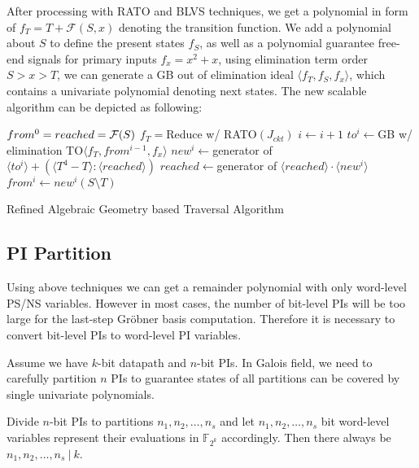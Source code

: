 After processing with RATO and BLVS techniques, we get a polynomial in form of $f_T = T+\mathcal{F}(S,x)$
denoting the transition function. We add a polynomial about $S$ to define the present states $f_S$,
as well as a polynomial guarantee free-end signals for primary inputs $f_x = x^2+x$, using elimination term order $S>x>T$,
we can generate a GB out of elimination ideal $\langle f_T,f_S,f_x\rangle$, which contains a univariate
polynomial denoting next states. The new scalable algorithm can be depicted as following:

\begin{algorithm}[hbt]
\SetAlgoNoLine

  $from^0 = reached = {\mathcal{F}}(S)$\;
  $f_T = $Reduce w/ RATO$(J_{ckt})$\;
  {
  	$i \gets i + 1$\;
	$to^i \gets$GB w/ elimination TO$\langle f_T, from^{i-1}, f_x\rangle$\;
	$new^i \gets $generator of $\langle to^i\rangle + (\langle T^4-T\rangle:\langle reached\rangle)$\;
  	$reached \gets $generator of $\langle reached\rangle \cdot \langle new^i\rangle$\;
	$from^i \gets new^i(S\setminus T)$\;
  }
\caption {Refined Algebraic Geometry based Traversal Algorithm}\label{alg:refined}
\end{algorithm}

\subsection{PI Partition}
Using above techniques we can get a remainder polynomial with only word-level PS/NS variables. However in most 
cases, the number of bit-level PIs will be too large for the last-step Gr\"obner basis computation. Therefore it is necessary
to convert bit-level PIs to word-level PI variables. 

Assume we have $k$-bit datapath and $n$-bit PIs. In Galois field, we need to carefully partition $n$ PIs
to guarantee states of all partitions can be covered by single univariate polynomials.

\begin{Proposition}
Divide $n$-bit PIs to partitions $n_1,n_2,\dots, n_s$ and let $n_1,n_2,\dots,n_s$ bit word-level variables
represent their evaluations in $\mathbb F_{2^k}$ accordingly. Then there always be $n_1,n_2,\dots,n_s~|~k$.
\end{Proposition}

